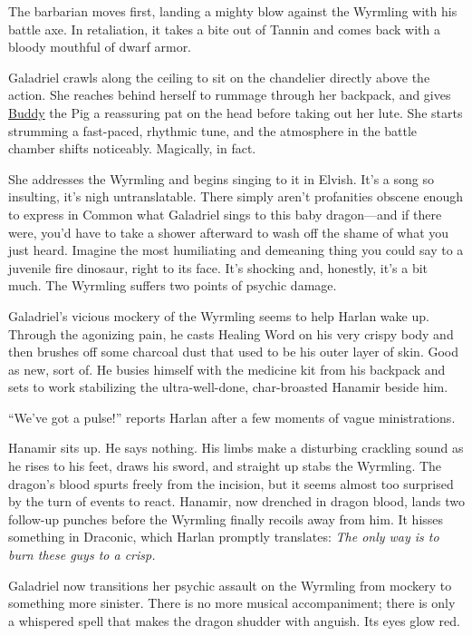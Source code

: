 \documentclass[smalldemyvopaper,11pt,twoside,onecolumn,openright,extrafontsizes]{memoir}
\begin{document}
The barbarian moves first, landing a mighty blow against the Wyrmling
with his battle axe. In retaliation, it takes a bite out of Tannin and
comes back with a bloody mouthful of dwarf armor.

Galadriel crawls along the ceiling to sit on the chandelier directly
above the action. She reaches behind herself to rummage through her
backpack, and gives \href{/characters/buddy/}{Buddy} the Pig a
reassuring pat on the head before taking out her lute. She starts
strumming a fast-paced, rhythmic tune, and the atmosphere in the battle
chamber shifts noticeably. Magically, in fact.

She addresses the Wyrmling and begins singing to it in Elvish. It's a
song so insulting, it's nigh untranslatable. There simply aren't
profanities obscene enough to express in Common what Galadriel sings to
this baby dragon---and if there were, you'd have to take a shower
afterward to wash off the shame of what you just heard. Imagine the most
humiliating and demeaning thing you could say to a juvenile fire
dinosaur, right to its face. It's shocking and, honestly, it's a bit
much. The Wyrmling suffers two points of psychic damage.

Galadriel's vicious mockery of the Wyrmling seems to help Harlan wake
up. Through the agonizing pain, he casts Healing Word on his very crispy
body and then brushes off some charcoal dust that used to be his outer
layer of skin. Good as new, sort of. He busies himself with the medicine
kit from his backpack and sets to work stabilizing the ultra-well-done,
char-broasted Hanamir beside him.

``We've got a pulse!'' reports Harlan after a few moments of vague
ministrations.

Hanamir sits up. He says nothing. His limbs make a disturbing crackling
sound as he rises to his feet, draws his sword, and straight up stabs
the Wyrmling. The dragon's blood spurts freely from the incision, but it
seems almost too surprised by the turn of events to react. Hanamir, now
drenched in dragon blood, lands two follow-up punches before the
Wyrmling finally recoils away from him. It hisses something in Draconic,
which Harlan promptly translates: \emph{The only way is to burn these
guys to a crisp.}

Galadriel now transitions her psychic assault on the Wyrmling from
mockery to something more sinister. There is no more musical
accompaniment; there is only a whispered spell that makes the dragon
shudder with anguish. Its eyes glow red.
\end{document}
